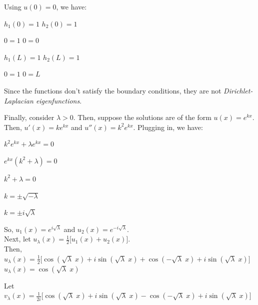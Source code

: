 \documentclass[12pt, executivepaper]{article}
\begin{document}
\begin{flushleft}
Using $u(0)=0$, we have: 

\begin{center}

$h_{1}(0)=1$ \quad \quad \quad $h_{2}(0)=1$

$0=1$ \quad \quad \quad $0=0$

\vspace{3mm}

$h_{1}(L)=1$ \quad \quad \quad $h_{2}(L)=1$

$0=1$ \quad \quad \quad $0=L$

\end{center}

Since the functions don't satisfy the boundary conditions, they are not \textit{Dirichlet-Laplacian eigenfunctions}.

\vspace{5mm}

Finally, consider $\lambda > 0$. Then, suppose the solutions are of the form $u(x)=e^{kx}$. Then, $u'(x)=ke^{kx}$ and $u''(x)=k^2e^{kx}$. Plugging in, we have:

\begin{center}

$k^2e^{kx}+ \lambda e^{kx}=0$

$e^{kx}(k^2+ \lambda)=0$

$k^2+ \lambda=0$

$k=\pm \sqrt{-\lambda}$

$k=\pm i \sqrt{\lambda}$

\end{center}

\pagebreak

\vspace*{-40mm}

So, $u_{1}(x)=e^{i \sqrt{\lambda}}$ and $u_{2}(x)=e^{-i \sqrt{\lambda}}$. \\

Next, let $u_{\lambda}(x)=\frac{1}{2}\bigg[u_{1}(x)+u_{2}(x)\bigg]$. \\

Then, \\ 
$u_{\lambda}(x)=\frac{1}{2}\bigg[\cos(\sqrt{\lambda} \; x)+i\sin(\sqrt{\lambda} \; x)+\cos(-\sqrt{\lambda} \; x)+i\sin(\sqrt{\lambda} \; x)\bigg]$ \\

$u_{\lambda}(x)=\cos(\sqrt{\lambda} \; x)$

\vspace{3mm}

Let $v_{\lambda}(x)=\frac{1}{2i}\bigg[\cos(\sqrt{\lambda} \; x)+i\sin(\sqrt{\lambda} \; x)-\cos(-\sqrt{\lambda} \; x)+i\sin(\sqrt{\lambda} \; x)\bigg]$ \\


\end{flushleft}
\end{document}
